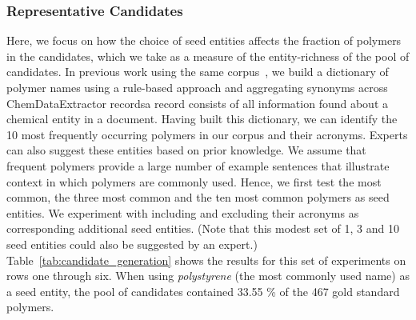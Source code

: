 \subsubsection{Representative Candidates}
Here, we focus on how the choice of seed entities affects the fraction of polymers in the candidates, which we take as a measure of the entity-richness of the pool of candidates.
In previous work using the same corpus~\cite{tchoua2016hybrid,tchoua2016hybridi}, we build a dictionary of polymer names using a rule-based approach and aggregating synonyms across ChemDataExtractor records\textemdash a record consists of all information found about a chemical entity in a document.  
Having built this dictionary, we can identify the 10 most frequently occurring polymers in our corpus and their acronyms.
Experts can also suggest these entities based on prior knowledge.
We assume that frequent polymers provide a large number of example sentences that illustrate context in which polymers are commonly used.
Hence, we first test the most common, the three most common and the ten most common polymers as seed entities.
We experiment with including and excluding their acronyms as corresponding additional seed entities.
(Note that this modest set of 1, 3 and 10 seed entities could also be suggested by an expert.)
Table~\ref{tab:candidate_generation} shows the results for this set of experiments on rows one through six.
When using \textit{polystyrene} (the most commonly used name) as a seed entity, the pool of candidates contained 33.55 \% of the 467 gold standard polymers.
